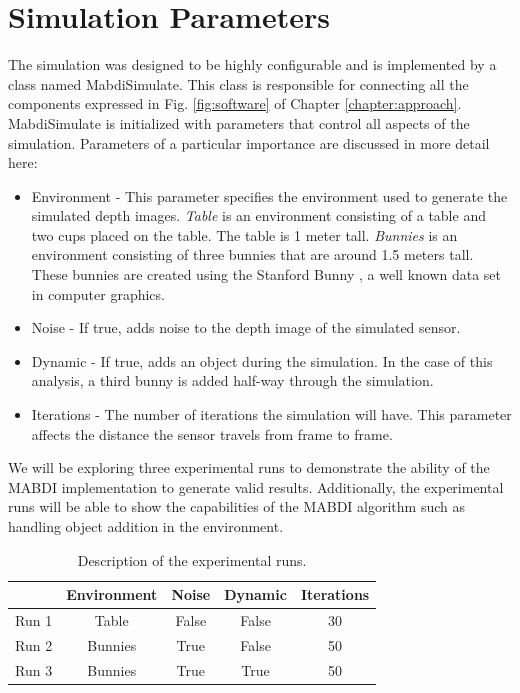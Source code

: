 \section{Simulation Parameters}

The simulation was designed to be highly configurable and is implemented by a
class named MabdiSimulate. This class is responsible for connecting all the
components expressed in Fig. \ref{fig:software} of Chapter
\ref{chapter:approach}. MabdiSimulate is initialized with parameters that
control all aspects of the simulation. Parameters of a particular importance are
discussed in more detail here:

\begin{itemize}
    \item Environment - This parameter specifies the environment used to generate
    the simulated depth images. \textit{Table} is an environment consisting of a
    table and two cups placed on the table. The table is 1 meter tall.
    \textit{Bunnies} is an environment consisting of three bunnies that are
    around 1.5 meters tall. These bunnies are created using the Stanford Bunny
    \cite{Turk1994}, a well known data set in computer graphics.
    \item Noise - If true, adds noise to the depth image of the simulated sensor.
    \item Dynamic - If true, adds an object during the simulation. In the case
    of this analysis, a third bunny is added half-way through the simulation.
    \item Iterations - The number of iterations the simulation will have. This
    parameter affects the distance the sensor travels from frame to frame.
\end{itemize}

We will be exploring three experimental runs to demonstrate the
ability of the MABDI implementation to generate valid results. Additionally, the
experimental runs will be able to show the capabilities of the MABDI algorithm
such as handling object addition in the environment.

\begin{table}[h]
  \caption{Description of the experimental runs.}
  \label{tab:run}
  \begin{footnotesize}
  \begin{center}
    \begin{tabular}{|l|c|c|c|c|}
    \hline
           & Environment & Noise   & Dynamic & Iterations \\\hline
    Run 1	 & Table       & False   & False   & 30 \\
    Run 2  & Bunnies     & True    & False   & 50 \\
    Run 3  & Bunnies     & True    & True    & 50 \\
    \hline
    \end{tabular}
  \end{center}
  \end{footnotesize}
\end{table}

